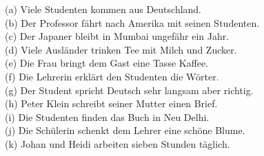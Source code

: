 \documentclass[a4paper,12pt]{article}
\begin{document}
(a) Viele Studenten kommen aus Deutschland.\\
(b) Der Professor fährt nach Amerika mit seinen Studenten.\\
(c) Der Japaner bleibt in Mumbai ungefähr ein Jahr.\\
(d) Viele Ausländer trinken Tee mit Milch und Zucker.\\
(e) Die Frau bringt dem Gast eine Tasse Kaffee.\\
(f) Die Lehrerin erklärt den Studenten die Wörter.\\
(g) Der Student spricht Deutsch sehr langsam aber richtig.\\
(h) Peter Klein schreibt seiner Mutter einen Brief.\\
(i) Die Studenten finden das Buch in Neu Delhi.\\
(j) Die Schülerin schenkt dem Lehrer eine schöne Blume.\\
(k) Johan und Heidi arbeiten sieben Stunden täglich.
\end{document}
